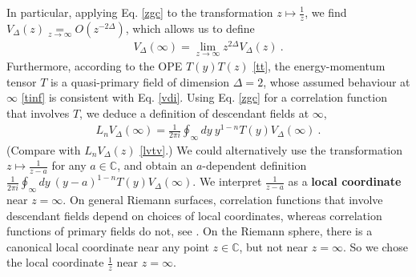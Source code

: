 \documentclass[12pt, a4paper]{article}
\newcommand{\myindex}[1]{\textbf{\boldmath #1}}
\begin{document}
In particular, applying Eq. \eqref{zgc} to the transformation $z\mapsto \frac{1}{z}$, we find $V_\Delta(z)\underset{z\to\infty}{=} O(z^{-2\Delta})$, which allows us to define 
\begin{align}
 V_\Delta(\infty) = \lim_{z\to\infty} z^{2\Delta}V_\Delta(z)\ . 
 \label{vdi}
\end{align}
Furthermore, 
according to the OPE $T(y)T(z)$ \eqref{tt}, the energy-momentum tensor $T$ is a quasi-primary field of dimension $\Delta=2$, whose assumed behaviour at $\infty$ \eqref{tinf} is consistent with Eq. \eqref{vdi}. 
Using Eq. \eqref{zgc} for a correlation function that involves $T$, we deduce a definition of descendant fields at $\infty$, 
\begin{align}
 L_n V_\Delta(\infty) = \frac{1}{2\pi i} \oint_\infty dy\ y^{1-n} T(y)V_\Delta(\infty)\ .
 \label{lnia}
\end{align}
(Compare with $L_nV_\Delta(z)$ \eqref{lvtv}.) 
We could alternatively use the transformation $z\mapsto \frac{1}{z-a}$ for any $a\in\mathbb{C}$, and obtain an $a$-dependent definition $ \frac{1}{2\pi i} \oint_\infty dy\ (y-a)^{1-n} T(y)V_\Delta(\infty)$. 
We interpret $\frac{1}{z-a}$ as a \myindex{local coordinate} near $z=\infty$. On general Riemann surfaces, correlation functions that involve descendant fields depend on choices of local coordinates, whereas correlation functions of primary fields do not, see \cite[Section 3]{br24}. On the Riemann sphere, there is
a canonical local coordinate near any point $z\in\mathbb{C}$, but not near $z=\infty$. So we chose the local coordinate $\frac{1}{z}$ near $z=\infty$. 
\end{document}
